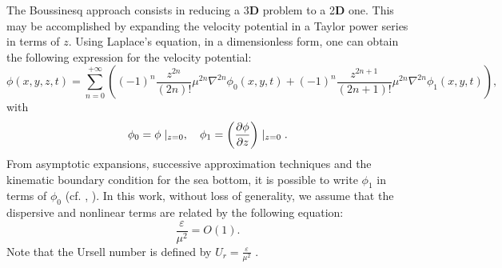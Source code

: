 The Boussinesq approach consists in reducing a 3{\bf D}
problem to a 2{\bf D} one. 
This may be accomplished by
 expanding the 
velocity potential in a Taylor power series in terms of \(z\). 
Using  Laplace's
equation, in a dimensionless form, one can obtain the
following  expression for the velocity potential:
\begin{equation}
\phi(x,y,z,t)=\sum_{n=0}^{+\infty}\left((-1)^n\frac{z^{2n}}{(2n)!}\mu^{2n}\nabla^{2n}\phi_0(x,y,t)+
(-1)^n \frac{z^{2n+1}}{(2n+1)!}\mu^{2n}\nabla^{2n}\phi_1(x,y,t)\right),
\end{equation}
with
\begin{equation}
\phi_0=\phi\mid_{ z=0},\quad \phi_1=\left(\frac{\partial \phi}{\partial z}\right)\mid_{z=0}.
\end{equation}
From asymptotic expansions,  successive approximation
techniques and the kinematic boundary condition for the sea bottom, it is possible to
write \(\phi_1\)   in terms of \(\phi_0\) (cf. \cite{CheLiu94}, \cite{ZhaTen04}). 
In this work, without loss of generality,  we  assume that
the dispersive and nonlinear terms are related by the
following equation: 
\begin{equation}
\frac{\varepsilon}{\mu^2}=O(1).
\end{equation}
Note that  the Ursell number is defined by \(\displaystyle U_r=\frac{\varepsilon}{\mu^2}\) .


